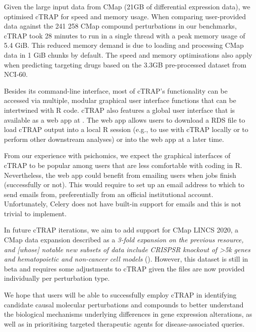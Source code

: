 Given the large input data from CMap (21GB of differential expression data), we optimised cTRAP for speed and memory usage. When comparing user-provided data against the 241 258 CMap compound perturbations in our benchmarks, cTRAP took 28 minutes to run in a single thread with a peak memory usage of 5.4 GiB. This reduced memory demand is due to loading and processing CMap data in 1 GiB chunks by default. The speed and memory optimisations also apply when predicting targeting drugs based on the 3.3GB pre-processed dataset from NCI-60.

Besides its command-line interface, most of cTRAP's functionality can be accessed via multiple, modular graphical user interface functions that can be intertwined with R code. cTRAP also features a global user interface that is available as a web app at . The web app allows users to download a RDS file to load cTRAP output into a local R session (e.g., to use with cTRAP locally or to perform other downstream analyses) or into the web app at a later time.

From our experience with psichomics, we expect the graphical interfaces of cTRAP to be popular among users that are less comfortable with coding in R. Nevertheless, the web app could benefit from emailing users when jobs finish (successfully or not). This would require to set up an email address to which to send emails from, preferentially from an official institutional account. Unfortunately, Celery does not have built-in support for emails and this is not trivial to implement.

In future cTRAP iterations, we aim to add support for CMap LINCS 2020, a CMap data expansion described as a \emph{3-fold expansion on the previous resource, and [whose] notable new subsets of data include CRISPSR knockout of \textgreater 5k genes and hematopoietic and non-cancer cell models} (). However, this dataset is still in beta and requires some adjustments to cTRAP given the files are now provided individually per perturbation type.

We hope that users will be able to successfully employ cTRAP in identifying candidate causal molecular perturbations and compounds to better understand the biological mechanisms underlying differences in gene expression alterations, as well as in prioritising targeted therapeutic agents for disease-associated queries.
